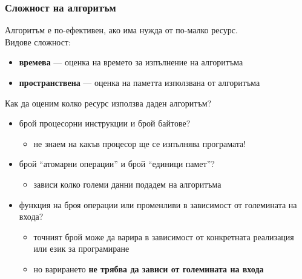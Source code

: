 \documentclass[alsotrans]{beamerswitch}
\begin{document}
\begin{frame}
  \frametitle{Сложност на алгоритъм}

  Алгоритъм е по-ефективен, ако има нужда от по-малко ресурс.\\
  \pause
  Видове сложност:
  \begin{itemize}[<+->]
  \item \textbf{времева} --- оценка на времето за изпълнение на алгоритъма
  \item \textbf{пространствена} --- оценка на паметта използвана от алгоритъма
  \end{itemize}
  \onslide<+->
  \vspace{1em}
  Как да оценим колко ресурс използва даден алгоритъм?\\[1em]
  \begin{itemize}[<+->]
  \item брой процесорни инструкции и брой байтове?
    \begin{itemize}
    \item не знаем на какъв процесор ще се изпълнява програмата!
    \end{itemize}
  \item брой ``атомарни операции'' и брой ``единици памет''?
    \begin{itemize}
    \item зависи колко големи данни подадем на алгоритъма
    \end{itemize}
  \item функция на броя операции или променливи в зависимост от големината на входа?
    \begin{itemize}
    \item точният брой може да варира в зависимост от конкретната реализация или език за програмиране
    \item но варирането \textbf{не трябва да зависи от големината на входа}
    \end{itemize}
  \end{itemize}
\end{frame}
\end{document}
